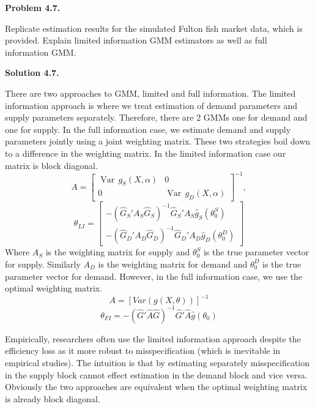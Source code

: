 \documentclass[11pt]{article}
\newenvironment{problem}[1]
    {\bigskip\noindent\textbf{Problem #1.}\par\setlength{\parindent}{0pt}}
    {\medskip}
\newenvironment{solution}[1]
    {\bigskip\noindent\textbf{Solution #1.} \par}
    {\medskip}
\begin{document}
\newpage
\begin{problem}{4.7}
Replicate estimation results for the simulated Fulton fish
market data, which is provided. Explain limited information
GMM estimators as well as full information GMM.
\end{problem}

\begin{solution}{4.7}




There are two approaches to GMM, limited and full information. The limited information approach is where we treat estimation of demand parameters and supply parameters separately. Therefore, there are 2 GMMs one for demand and one for supply. In the full information case, we estimate demand and supply parameters jointly using a joint weighting matrix. These two strategies boil down to a difference in the weighting matrix. In the limited information case our matrix is block diagonal.
\[
A =
\left[
\begin{array}{cc}
\operatorname{Var}\, g_S(X,\alpha) & 0 \\
0 & \operatorname{Var}\, g_D(X,\alpha)
\end{array}
\right]^{-1},
\]
\[\theta_{LI}  = \begin{bmatrix} -(\hat{G}_S'A_S\hat{G}_S)^{-1}\hat{G}_S'A_S\hat{g}_S(\theta_0^S) \\ -(\hat{G}_D'A_D\hat{G}_D)^{-1}\hat{G}_D'A_D\hat{g}_D(\theta_0^D) \end{bmatrix} \]
Where $A_S$ is the weighting matrix for supply and $\theta_0^S$ is the true parameter vector for supply. Similarly $A_D$ is the weighting matrix for demand and $\theta_0^D$ is the true parameter vector for demand.
However, in the full information case, we use the optimal weighting matrix. 
\[A= [Var(g(X,\theta))]^{-1}\]
\[\theta_{FI} = -(\hat{G}'\hat{A}\hat{G})^{-1}\hat{G}'\hat{A}\hat{g}(\theta_0)\]


Empirically, researchers often use the limited information approach despite the efficiency loss as it more robust to misspecification (which is inevitable in empirical studies). The intuition is that by estimating separately misspecification in the supply block cannot effect estimation in the demand block and vice versa. Obviously the two approaches are equivalent when the optimal weighting matrix is already block diagonal.


        
\end{solution}
\end{document}
